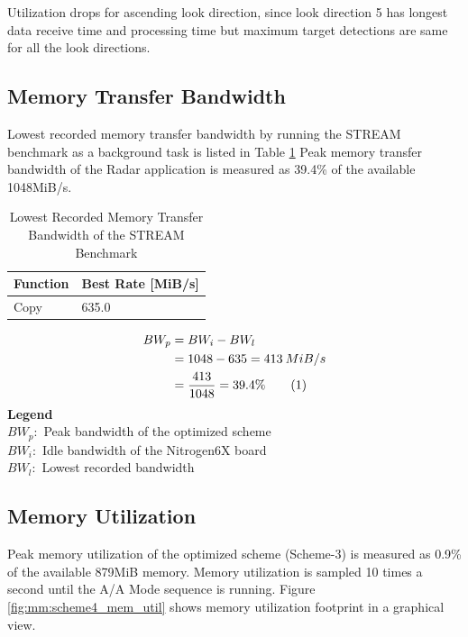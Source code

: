 Utilization drops for ascending look direction, since look direction 5 has longest data receive time and processing time but maximum target detections are same for all the look directions. 
\FloatBarrier

\subsection{Memory Transfer Bandwidth}
\label{ss:mm:scheme4:bw_util}
Lowest recorded memory transfer bandwidth by running the STREAM benchmark as a background task is listed in Table \ref{tbl:mm:scheme4_mem_bw} 
Peak memory transfer bandwidth of the Radar application is measured as 39.4\% of the available 1048MiB/s.

\begin{table}[h!]
	\centering
	\begin{tabular}{|l|l|} 
	 \hline
	 \textbf{Function} & \textbf{Best Rate [MiB/s]} \\
	 \hline
	 Copy & 635.0 \\ \hline
	\end{tabular}
	\caption{Lowest Recorded Memory Transfer Bandwidth of the STREAM Benchmark}
	\label{tbl:mm:scheme4_mem_bw}
\end{table}

\begin{align*}
\label{aa:scheme4:mem_bw}
	BW_{p} &= BW_{i} - BW_{l} \\
	&= 1048 - 635 = 413 \: MiB/s \\
	&= \frac{413}{1048} = 39.4 \% \stepcounter{equation}\tag{\theequation} 
\end{align*}
\noindent 
\textbf{Legend}\\
\tab $BW_{p}:$ Peak bandwidth of the optimized scheme \\
\tab $BW_{i}:$ Idle bandwidth of the Nitrogen6X board \\
\tab $BW_{l}:$ Lowest recorded bandwidth \\

\subsection{Memory Utilization}
\label{ss:mm:scheme4:mem_util}
Peak memory utilization of the optimized scheme (Scheme-3) is measured as 0.9\% of the available 879MiB memory. Memory utilization is sampled 10 times a second until the A/A Mode sequence is running. Figure \ref{fig:mm:scheme4_mem_util} shows memory utilization footprint in a graphical view.

